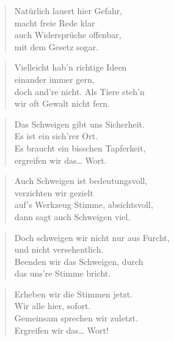\documentclass[10pt,a4paper]{article}
\begin{document}
\begin{multicols}{2}
\begin{verse}
Natürlich lauert hier Gefahr, \\
macht freie Rede klar \\
auch Widersprüche offenbar, \\
mit dem Gesetz sogar. \\
\end{verse}

\begin{verse}
Vielleicht hab’n richtige Ideen \\
einander immer gern, \\
doch and’re nicht. Als Tiere steh’n \\
wir oft Gewalt nicht fern. \\
\end{verse}

\begin{verse}
Das Schweigen gibt uns Sicherheit. \\
Es ist ein sich’rer Ort. \\
Es braucht ein bisschen Tapferkeit, \\
ergreifen wir das… Wort. \\
\end{verse}

\begin{verse}
Auch Schweigen ist bedeutungsvoll, \\
verzichten wir gezielt \\
auf’s Werkzeug Stimme, absichtsvoll, \\
dann sagt auch Schweigen viel. \\
\end{verse}

\begin{verse}
Doch schweigen wir nicht nur aus Furcht, \\
und nicht versehentlich. \\
Beenden wir das Schweigen, durch \\
das uns’re Stimme bricht. \\
\end{verse}

\begin{verse}
Erheben wir die Stimmen jetzt. \\
Wir alle hier, sofort. \\
Gemeinsam sprechen wir zuletzt. \\
Ergreifen wir das… Wort! \\
\end{verse}


\end{multicols}
\end{document}
